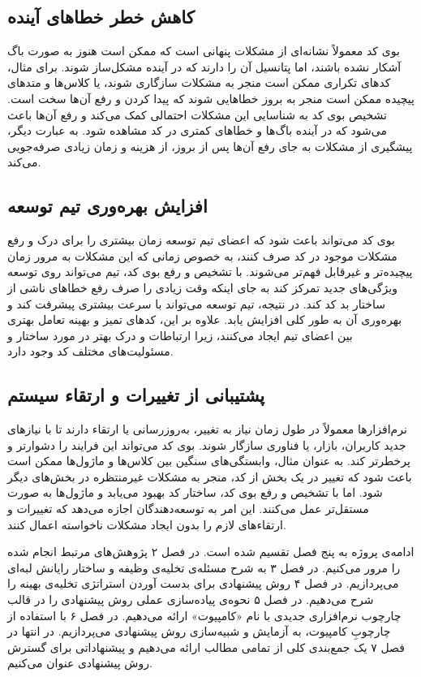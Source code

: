 \subsection{کاهش خطر خطاهای آینده}
بوی کد معمولاً نشانه‌ای از مشکلات پنهانی است که ممکن است هنوز به صورت باگ آشکار نشده باشند، اما پتانسیل آن را دارند که در آینده مشکل‌ساز شوند. برای مثال، کدهای تکراری ممکن است منجر به مشکلات سازگاری شوند، یا کلاس‌ها و متدهای پیچیده ممکن است منجر به بروز خطاهایی شوند که پیدا کردن و رفع آن‌ها سخت است. تشخیص بوی کد به شناسایی این مشکلات احتمالی کمک می‌کند و رفع آن‌ها باعث می‌شود که در آینده باگ‌ها و خطاهای کمتری در کد مشاهده شود. به عبارت دیگر، پیشگیری از مشکلات به جای رفع آن‌ها پس از بروز، از هزینه و زمان زیادی صرفه‌جویی می‌کند.
\subsection{افزایش بهره‌وری تیم توسعه}
بوی کد می‌تواند باعث شود که اعضای تیم توسعه زمان بیشتری را برای درک و رفع مشکلات موجود در کد صرف کنند، به خصوص زمانی که این مشکلات به مرور زمان پیچیده‌تر و غیرقابل فهم‌تر می‌شوند. با تشخیص و رفع بوی کد، تیم می‌تواند روی توسعه ویژگی‌های جدید تمرکز کند به جای اینکه وقت زیادی را صرف رفع خطاهای ناشی از ساختار بد کد کند. در نتیجه، تیم توسعه می‌تواند با سرعت بیشتری پیشرفت کند و بهره‌وری آن به طور کلی افزایش یابد. علاوه بر این، کدهای تمیز و بهینه تعامل بهتری بین اعضای تیم ایجاد می‌کنند، زیرا ارتباطات و درک بهتر در مورد ساختار و مسئولیت‌های مختلف کد وجود دارد.
\subsection {پشتیبانی از تغییرات و ارتقاء سیستم}
نرم‌افزارها معمولاً در طول زمان نیاز به تغییر، به‌روزرسانی یا ارتقاء دارند تا با نیازهای جدید کاربران، بازار، یا فناوری سازگار شوند. بوی کد می‌تواند این فرایند را دشوارتر و پرخطرتر کند. به عنوان مثال، وابستگی‌های سنگین بین کلاس‌ها و ماژول‌ها ممکن است باعث شود که تغییر در یک بخش از کد، منجر به مشکلات غیرمنتظره در بخش‌های دیگر شود. اما با تشخیص و رفع بوی کد، ساختار کد بهبود می‌یابد و ماژول‌ها به صورت مستقل‌تر عمل می‌کنند. این امر به توسعه‌دهندگان اجازه می‌دهد که تغییرات و ارتقاءهای لازم را بدون ایجاد مشکلات ناخواسته اعمال کنند.

ادامه‌ی پروژه به پنج فصل تقسیم شده است. در فصل ۲ پژوهش‌های مرتبط انجام شده را مرور می‌کنیم. در فصل ۳ به شرح مسئله‌ی تخلیه‌ی وظیفه و ساختار رایانش لبه‌ای می‌پردازیم. در فصل ۴ روش پیشنهادی برای بدست آوردن استراتژی تخلیه‌ی بهینه را شرح می‌دهیم. در فصل ۵ نحوه‌ی پیاده‌سازی عملی روش پیشنهادی را در قالب چارچوب نرم‌افزاری جدیدی با نام «کامپیوت» ارائه می‌دهیم. در فصل ۶ با استفاده از چارچوبِ کامپیوت، به آزمایش و شبیه‌سازی روش پیشنهادی می‌پردازیم. در انتها در فصل ۷ یک جمع‌بندی کلی از تمامی مطالب ارائه می‌دهیم و پیشنهاداتی برای گسترش روش پیشنهادی عنوان می‌کنیم.

\clearpage
